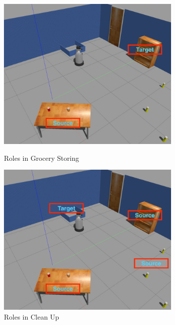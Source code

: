 \documentclass[main.tex]{subfiles}
\begin{document}
\begin{figure}
    \centering
        \includegraphics[width=0.8\textwidth]{pictures/knowledge/knowledge_roles_gr}
        \caption{Roles in Grocery Storing}
        \label{fig:kn_ro_gr}
        \includegraphics[width=0.8\textwidth]{pictures/knowledge/knowledge_roles_cl}
        \caption{Roles in Clean Up}
        \label{fig:kn_ro_cl}
\end{figure}
\end{document}
